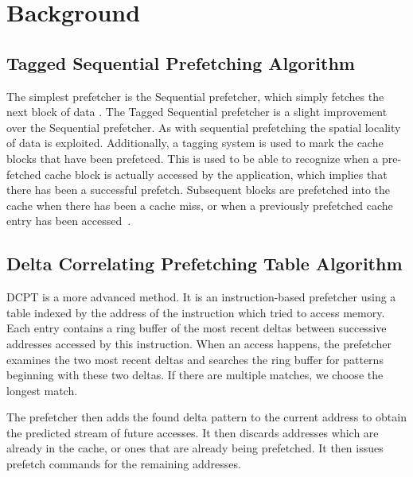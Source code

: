 \section{Background}

\subsection{Tagged Sequential Prefetching Algorithm}

The simplest prefetcher is the Sequential prefetcher, which simply fetches the
next block of data \cite{seq}. The Tagged Sequential prefetcher is a slight
improvement over the Sequential prefetcher. As with sequential prefetching the
spatial locality of data is exploited. Additionally, a tagging system is used to
mark the cache blocks that have been prefetced. This is used to be able to
recognize when a pre-fetched cache block is actually accessed by the
application, which implies that there has been a successful prefetch. Subsequent
blocks are prefetched into the cache when there has been a cache miss, or when a
previously prefetched cache entry has been accessed~\cite{grannaes}.

\subsection{Delta Correlating Prefetching Table Algorithm}

DCPT is a more advanced method. It is an instruction-based prefetcher using a
table indexed by the address of the instruction which tried to access memory.
Each entry contains a ring buffer of the most recent deltas between successive
addresses accessed by this instruction. When an access happens, the prefetcher
examines the two most recent deltas and searches the ring buffer for patterns
beginning with these two deltas. If there are multiple matches, we choose the
longest match.

The prefetcher then adds the found delta pattern to the current address to
obtain the predicted stream of future accesses. It then discards addresses which
are already in the cache, or ones that are already being prefetched. It then
issues prefetch commands for the remaining addresses.

